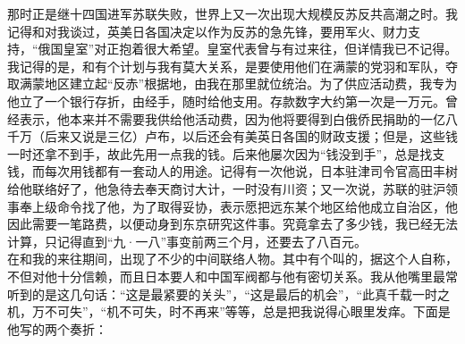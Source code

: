 那时正是继十四国进军苏联失败，世界上又一次出现大规模反苏反共高潮之时。我记得和对我谈过，英美日各国决定以作为反苏的急先锋，要用军火、财力支持，“俄国皇室”对正抱着很大希望。皇室代表曾与有过来往，但详情我已不记得。我记得的是，和有个计划与我有莫大关系，是要使用他们在满蒙的党羽和军队，夺取满蒙地区建立起“反赤”根据地，由我在那里就位统治。为了供应活动费，我专为他立了一个银行存折，由经手，随时给他支用。存款数字大约第一次是一万元。曾经表示，他本来并不需要我供给他活动费，因为他将要得到白俄侨民捐助的一亿八千万（后来又说是三亿）卢布，以后还会有美英日各国的财政支援；但是，这些钱一时还拿不到手，故此先用一点我的钱。后来他屡次因为“钱没到手”，总是找支钱，而每次用钱都有一套动人的用途。记得有一次他说，日本驻津司令官高田丰树给他联络好了，他急待去奉天商讨大计，一时没有川资；又一次说，苏联的驻沪领事奉上级命令找了他，为了取得妥协，表示愿把远东某个地区给他成立自治区，他因此需要一笔路费，以便动身到东京研究这件事。究竟拿去了多少钱，我已经无法计算，只记得直到“九·一八”事变前两三个月，还要去了八百元。\\

在和我的来往期间，出现了不少的中间联络人物。其中有个叫的，据这个人自称，不但对他十分信赖，而且日本要人和中国军阀都与他有密切关系。我从他嘴里最常听到的是这几句话：“这是最紧要的关头”，“这是最后的机会”，“此真千载一时之机，万不可失”，“机不可失，时不再来”等等，总是把我说得心眼里发痒。下面是他写的两个奏折：\\

